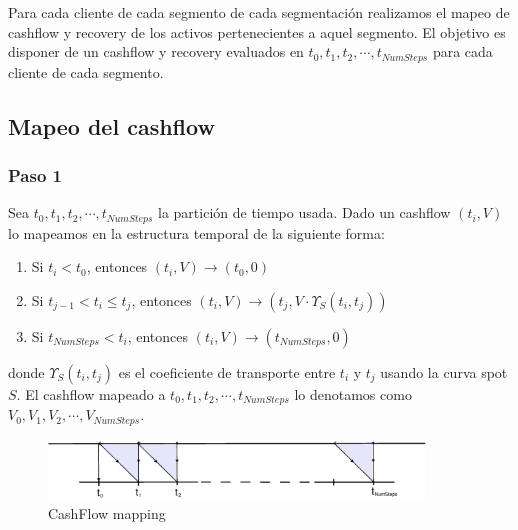 Para cada cliente de cada segmento de cada segmentaci\'on realizamos el
mapeo de cashflow y recovery de los activos pertenecientes a aquel
segmento. El objetivo es disponer de un cashflow y recovery evaluados en
$t_0, t_1, t_2, \cdots, t_{NumSteps}$ para cada cliente de cada segmento.


\subsection{Mapeo del cashflow}

\subsubsection{Paso 1}

Sea $t_0, t_1, t_2, \cdots, t_{NumSteps}$ la partici\'on de tiempo usada.
Dado un cashflow $(t_i,V)$ lo mapeamos en la estructura temporal de la
siguiente forma:

\begin{enumerate}
\item Si $t_i < t_0$, entonces $(t_i,V) \longrightarrow (t_0,0)$
\item Si $t_{j-1} < t_i \leq t_j$, entonces $(t_i,V) \longrightarrow (t_j,V \cdot \Upsilon_S(t_i,t_j))$
\item Si $t_{NumSteps} < t_i$, entonces $(t_i,V) \longrightarrow (t_{NumSteps},0)$
\end{enumerate}

donde $\Upsilon_S(t_i,t_j)$ es el coeficiente de transporte entre $t_i$ y $t_j$
usando la curva spot $S$. El cashflow mapeado a 
$t_0, t_1, t_2, \cdots, t_{NumSteps}$ lo denotamos como
$V_0, V_1, V_2, \cdots, V_{NumSteps}$.

\begin{figure}[!hb]
\begin{center}
\includegraphics[width=10cm,angle=0]{./images/cashflowmapping.eps}
\caption{CashFlow mapping}
\label{timetranches}
\end{center}
\end{figure}

